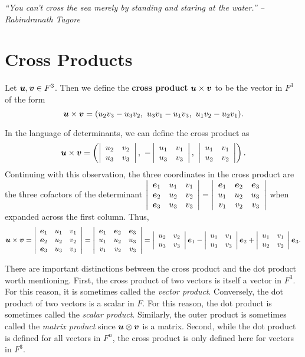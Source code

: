\begin{center} 
\emph{``You can't cross the sea merely by standing and staring at the water.'' -- Rabindranath Tagore}
\end{center}

\section{Cross Products}\label{sec:cross}
\begin{Def}
Let $\bb u, \bb v\in F^3$. Then we define the \textbf{cross product} $\bb u \times \bb v$ to be the vector in $F^3$ of the form
\[\bb u \times \bb v = (u_2v_3-u_3v_2,\ u_3v_1 - u_1v_3,\ u_1v_2-u_2v_1).\]
\end{Def}\vs

In the language of determinants, we can define the cross product as 
\begin{equation}\label{eq:cross}\bb u \times \bb v = \left( \dtx{rr}{u_2 & v_2 \\ u_3 & v_3},\ -\dtx{rr}{u_1 & v_1 \\ u_3 & v_3},\ \dtx{rr}{u_1 & v_1 \\ u_2 & v_2}\right).\end{equation} Continuing with this observation, the three coordinates in the cross product are the three cofactors of the determinant $\dtx{rrr}{\bb e_1 & u_1 & v_1 \\ \bb e_2 & u_2 & v_2 \\ \bb e_3 & u_3 & v_3} = \dtx{rrr}{\bb e_1 & \bb e_2 & \bb e_3 \\ u_1 & u_2 & u_3 \\ v_1 & v_2 & v_3}$ when expanded across the first column. Thus, \[\bb u \times \bb v = \dtx{rrr}{\bb e_1 & u_1 & v_1 \\ \bb e_2 & u_2 & v_2 \\ \bb e_3 & u_3 & v_3} = \dtx{rrr}{\bb e_1 & \bb e_2 & \bb e_3 \\ u_1 & u_2 & u_3 \\ v_1 & v_2 & v_3} = \dtx{rr}{u_2 & v_2 \\ u_3 & v_3}\bb e_1 -\dtx{rr}{u_1 & v_1 \\ u_3 & v_3}\bb e_2 + \dtx{rr}{u_1 & v_1 \\ u_2 & v_2}\bb e_3.\]\vs 

There are important distinctions between the cross product and the dot product worth mentioning. First, the cross product of two vectors is itself a vector in $F^3$. For this reason, it is sometimes called the \emph{vector product}. Conversely, the dot product of two vectors is a scalar in $F$. For this reason, the dot product is sometimes called the \emph{scalar product}. Similarly, the outer product is sometimes called the \emph{matrix product} since $\bb u \otimes \bb v$ is a matrix. Second, while the dot product is defined for all vectors in $F^n$, the cross product is only defined here for vectors in $F^3$.\\

